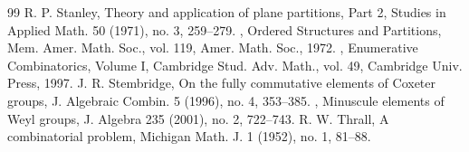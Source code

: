 \documentclass[10pt]{amsart}
\theoremstyle{definition}
\theoremstyle{remark}
\begin{document}
\begin{thebibliography}{99}
 R. P. Stanley, Theory and application of plane partitions, Part 2, Studies in Applied Math. 50 (1971), no. 3, 259–279.
 , Ordered Structures and Partitions, Mem. Amer. Math. Soc., vol. 119, Amer. Math. Soc., 1972.
 , Enumerative Combinatorics, Volume I, Cambridge Stud. Adv. Math., vol. 49, Cambridge Univ. Press, 1997.
 J. R. Stembridge, On the fully commutative elements of Coxeter groups, J. Algebraic Combin. 5 (1996), no. 4, 353–385.
 , Minuscule elements of Weyl groups, J. Algebra 235 (2001), no. 2, 722–743.
 R. W. Thrall, A combinatorial problem, Michigan Math. J. 1 (1952), no. 1, 81–88.
\end{thebibliography}
\end{document}
